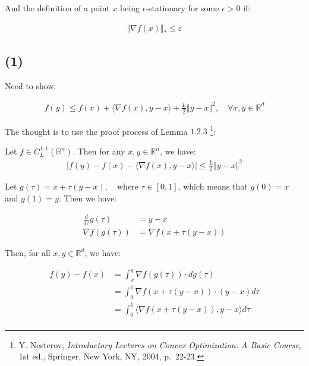 \documentclass{article}
\begin{document}
And the definition of a point $x$ being $\epsilon$-stationary for some $\epsilon > 0$ if:

\begin{align*}
    \Vert \nabla f (x) \Vert_* \leq \varepsilon
\end{align*}

\subsection*{(1)}

Need to show:

\begin{align*}
    f ( y ) \leq f ( x ) + \langle \nabla f ( x ), y - x \rangle + \frac{L}{2} \Vert y - x \Vert^2 , \quad \forall x, y \in \mathbb{R}^d
\end{align*}

The thought is to use the proof process of Lemma $1.2.3$
\footnote{Y. Nesterov, \textit{Introductory Lectures on Convex Optimization: A Basic Course}, 1st ed., Springer, New York, NY, 2004, p.~22-23.}:

\begin{tcolorbox}[greenbox, title = Lemma 1.2.3]
    Let $f \in C^{1,1}_L(\mathbb{R}^n)$. Then for any $x, y \in \mathbb{R}^n$, we have:
    \begin{align*}
        |f ( y ) - f ( x ) - \langle \nabla f ( x ), y - x \rangle| \leq \frac{L}{2} \Vert y - x \Vert^2
    \end{align*}
\end{tcolorbox}

Let $g(\tau) = x + \tau (y - x), \quad \text{where } \tau \in [0, 1]$, 
which means that $g(0) = x$ and $g(1) = y$.
Then we have:

\begin{align*}
    \frac{d}{d\tau} g(\tau) &= y - x \\
    \nabla f ( g(\tau) ) &= \nabla f ( x + \tau ( y - x ) ) 
\end{align*}

Then, for all $x, y \in \mathbb{R}^d$, we have:

\begin{align*}
    f(y) - f(x) 
    &= \int^{y}_{x} \nabla f ( g(\tau) ) \cdot d g(\tau) \\
    &= \int^{1}_{0} \nabla f ( x + \tau ( y - x ) ) \cdot ( y - x ) d\tau \\
    &= \int^{1}_{0} \langle \nabla f ( x + \tau ( y - x ) ) , y - x \rangle d\tau \\
\end{align*}
\end{document}
